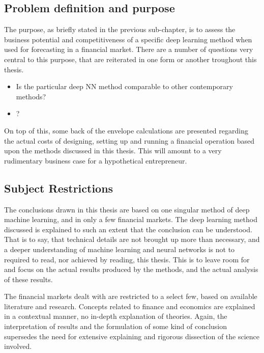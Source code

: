 \subsection{Problem definition and purpose}

The purpose, as briefly stated in the previous sub-chapter, is to assess the business potential and competitiveness of a specific deep learning method when used for forecasting in a financial market. There are a number of questions very central to this purpose, that are reiterated in one form or another troughout this thesis.

\begin{itemize}

\item Is the particular deep NN method comparable to other contemporary methods?

\item ?

\end{itemize}

On top of this, some back of the envelope calculations are presented regarding the actual costs of designing, setting up and running a financial operation based upon the methods discussed in this thesis. This will amount to a very rudimentary business case for a hypothetical entrepreneur.




\subsection{Subject Restrictions}

The conclusions drawn in this thesis are based on one singular method of deep machine learning, and in only a few financial markets. The deep learning method discussed is explained to such an extent that the conclusion can be understood. That is to say, that technical details are not brought up more than necessary, and a deeper understanding of machine learning and neural networks is not to required to read, nor achieved by reading, this thesis. This is to leave room for and focus on the actual results produced by the methods, and the actual analysis of these results.

The financial markets dealt with are restricted to a select few, based on available literature and research. Concepts related to finance and economics are explained in a contextual manner, no in-depth explanation of theories. Again, the interpretation of results and the formulation of some kind of conclusion supersedes the need for extensive explaining and rigorous dissection of the science involved.

